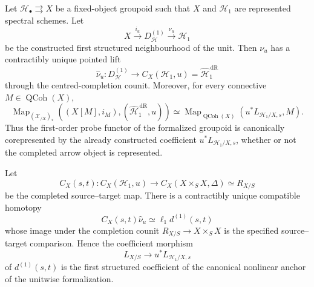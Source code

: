 \begin{theorem}
\label{thm:bnla-first-neighbourhood-formalization}
Let $\mathcal H_\bullet\rightrightarrows X$ be a fixed-object groupoid such
that $X$ and $\mathcal H_1$ are represented spectral schemes.  Let
\[
    X\xrightarrow{i_u}D^{(1)}_{\mathcal H}
    \xrightarrow{\nu_u}\mathcal H_1
\]
be the constructed first structured neighbourhood of the unit.  Then
$\nu_u$ has a contractibly unique pointed lift
\[
    \boxed{
    \widehat\nu_u:
    D^{(1)}_{\mathcal H}
    \longrightarrow
    C_X(\mathcal H_1,u)
    =
    \widehat{\mathcal H}^{\,\mathrm{dR}}_1}
\]
through the centred-completion counit.  Moreover, for every connective
$M\in\operatorname{QCoh}(X)$,
\[
\boxed{
\operatorname{Map}_{(\mathcal X_{/X})_*}
\left(
    (X[M],i_M),
    (\widehat{\mathcal H}^{\,\mathrm{dR}}_1,u)
\right)
\simeq
\operatorname{Map}_{\operatorname{QCoh}(X)}
\left(
    u^*L_{\mathcal H_1/X,s},M
\right).}
\]
Thus the first-order probe functor of the formalized groupoid is canonically
corepresented by the already constructed coefficient
$u^*L_{\mathcal H_1/X,s}$, whether or not the completed arrow object is
represented.

Let
\[
    C_X(s,t):
    C_X(\mathcal H_1,u)
    \longrightarrow
    C_X(X\times_SX,\Delta)
    \simeq
    R_{X/S}
\]
be the completed source--target map.  There is a contractibly unique compatible
homotopy
\[
\boxed{
    C_X(s,t)\widehat\nu_u
    \simeq
    \ell_1d^{(1)}(s,t)}
\]
whose image under the completion counit
$R_{X/S}\to X\times_SX$ is the specified source--target comparison.  Hence the
coefficient morphism
\[
    L_{X/S}\longrightarrow u^*L_{\mathcal H_1/X,s}
\]
of $d^{(1)}(s,t)$ is the first structured coefficient of the canonical
nonlinear anchor of the unitwise formalization.
\end{theorem}

